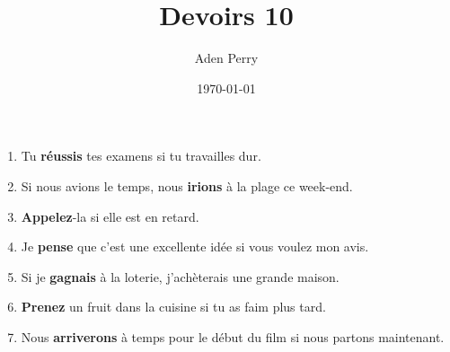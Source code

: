 \documentclass{article}
\title{Devoirs 10}
\author{Aden Perry}
\date{\today}
\begin{document}
\maketitle

\begin{enumerate}
	\item Tu \textbf{réussis} tes examens si tu travailles dur.
	\item Si nous avions le temps, nous \textbf{irions} à la plage ce week-end.
	\item \textbf{Appelez}-la si elle est en retard.
	\item Je \textbf{pense} que c'est une excellente idée si vous voulez mon
	      avis.
	\item Si je \textbf{gagnais} à la loterie, j'achèterais une grande maison.
	\item \textbf{Prenez} un fruit dans la cuisine si tu as faim plus tard.
	\item Nous \textbf{arriverons} à temps pour le début du film si nous
	      partons maintenant.
\end{enumerate}
\end{document}
